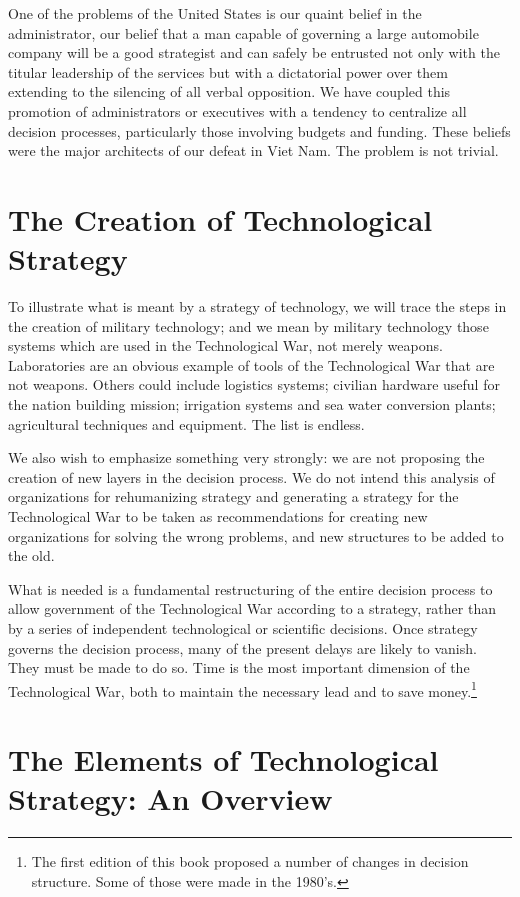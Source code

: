 One of the problems of the United States is our quaint belief in the administrator, our belief that a man capable of governing a large automobile company will be a good strategist and can safely be entrusted not only with the titular leadership of the services but with a dictatorial power over them extending to the silencing of all verbal opposition. We have coupled this promotion of administrators or executives with a tendency to centralize all decision processes, particularly those involving budgets and funding. These beliefs were the major architects of our defeat in Viet Nam. The problem is not trivial.

\section{The Creation of Technological Strategy}
To illustrate what is meant by a strategy of technology, we will trace the steps in the creation of military technology; and we mean by military technology those systems which are used in the Technological War, not merely weapons. Laboratories are an obvious example of tools of the Technological War that are not weapons. Others could include logistics systems; civilian hardware useful for the nation building mission; irrigation systems and sea water conversion plants; agricultural techniques and equipment. The list is endless.

We also wish to emphasize something very strongly: we are not proposing the creation of new layers in the decision process. We do not intend this analysis of organizations for rehumanizing strategy and generating a strategy for the Technological War to be taken as recommendations for creating new organizations for solving the wrong problems, and new structures to be added to the old.

What is needed is a fundamental restructuring of the entire decision process to allow government of the Technological War according to a strategy, rather than by a series of independent technological or scientific decisions. Once strategy governs the decision process, many of the present delays are likely to vanish. They must be made to do so. Time is the most important dimension of the Technological War, both to maintain the necessary lead and to save money.\footnote{The first edition of this book proposed a number of changes in decision structure. Some of those were made in the 1980's.}

\section{The Elements of Technological Strategy: An Overview}

